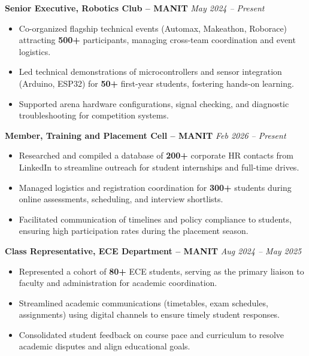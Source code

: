 \documentclass[8pt,letterpaper]{article}
\begin{document}
\textbf{Senior Executive, Robotics Club -- MANIT} \hfill \textit{May 2024 -- Present}
\begin{itemize}
    \item Co-organized flagship technical events (Automax, Makeathon, Roborace) attracting \textbf{500+} participants, managing cross-team coordination and event logistics.
    \item Led technical demonstrations of microcontrollers and sensor integration (Arduino, ESP32) for \textbf{50+} first-year students, fostering hands-on learning.
    \item Supported arena hardware configurations, signal checking, and diagnostic troubleshooting for competition systems.
\end{itemize}
\vspace{2.5pt}
\textbf{Member, Training and Placement Cell -- MANIT} \hfill \textit{Feb 2026 -- Present}
\begin{itemize}
    \item Researched and compiled a database of \textbf{200+} corporate HR contacts from LinkedIn to streamline outreach for student internships and full-time drives.
    \item Managed logistics and registration coordination for \textbf{300+} students during online assessments, scheduling, and interview shortlists.
    \item Facilitated communication of timelines and policy compliance to students, ensuring high participation rates during the placement season.
\end{itemize}
\vspace{2.5pt}
\textbf{Class Representative, ECE Department -- MANIT} \hfill \textit{Aug 2024 -- May 2025}
\begin{itemize}
    \item Represented a cohort of \textbf{80+} ECE students, serving as the primary liaison to faculty and administration for academic coordination.
    \item Streamlined academic communications (timetables, exam schedules, assignments) using digital channels to ensure timely student responses.
    \item Consolidated student feedback on course pace and curriculum to resolve academic disputes and align educational goals.
\end{itemize}

\end{document}

